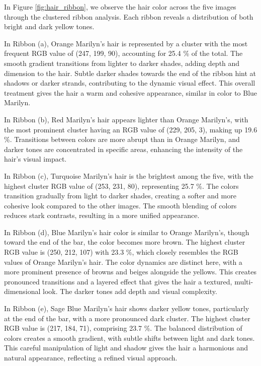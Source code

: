 \documentclass{article}
\begin{document}
In Figure \ref{fig:hair_ribbon}, we observe the hair color across the five images through the clustered ribbon analysis. Each ribbon reveals a distribution of both bright and dark yellow tones.

In Ribbon (a), Orange Marilyn’s hair is represented by a cluster with the most frequent RGB value of (247, 199, 90), accounting for 25.4 \% of the total. The smooth gradient transitions from lighter to darker shades, adding depth and dimension to the hair. Subtle darker shades towards the end of the ribbon hint at shadows or darker strands, contributing to the dynamic visual effect. This overall treatment gives the hair a warm and cohesive appearance, similar in color to Blue Marilyn.

In Ribbon (b), Red Marilyn’s hair appears lighter than Orange Marilyn’s, with the most prominent cluster having an RGB value of (229, 205, 3), making up 19.6 \%. Transitions between colors are more abrupt than in Orange Marilyn, and darker tones are concentrated in specific areas, enhancing the intensity of the hair’s visual impact.

In Ribbon (c), Turquoise Marilyn’s hair is the brightest among the five, with the highest cluster RGB value of (253, 231, 80), representing 25.7 \%. The colors transition gradually from light to darker shades, creating a softer and more cohesive look compared to the other images. The smooth blending of colors reduces stark contrasts, resulting in a more unified appearance.

In Ribbon (d), Blue Marilyn’s hair color is similar to Orange Marilyn’s, though toward the end of the bar, the color becomes more brown. The highest cluster RGB value is (250, 212, 107) with 23.3 \%, which closely resembles the RGB values of Orange Marilyn’s hair. The color dynamics are distinct here, with a more prominent presence of browns and beiges alongside the yellows. This creates pronounced transitions and a layered effect that gives the hair a textured, multi-dimensional look. The darker tones add depth and visual complexity.

In Ribbon (e), Sage Blue Marilyn’s hair shows darker yellow tones, particularly at the end of the bar, with a more pronounced dark cluster. The highest cluster RGB value is (217, 184, 71), comprising 23.7 \%. The balanced distribution of colors creates a smooth gradient, with subtle shifts between light and dark tones. This careful manipulation of light and shadow gives the hair a harmonious and natural appearance, reflecting a refined visual approach.
\end{document}
